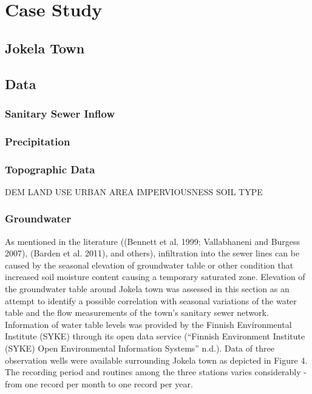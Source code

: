 
\chapter{Case Study}

\section{Jokela Town}

\section{Data}

    \subsection{Sanitary Sewer Inflow}
    
    \subsection{Precipitation}
    
    \subsection{Topographic Data}
    DEM
    LAND USE
    URBAN AREA
    IMPERVIOUSNESS
    SOIL TYPE
    
    \subsection{Groundwater}

As mentioned in the literature ((Bennett et al. 1999; Vallabhaneni and Burgess 2007), (Barden et al. 2011), and others), infiltration into the sewer lines can be caused by the seasonal elevation of groundwater table or other condition that increased soil moisture content causing a temporary saturated zone. Elevation of the groundwater table around Jokela town was assessed in this section as an attempt to identify a possible correlation with seasonal variations of the water table and the flow measurements of the town’s sanitary sewer network. 
Information of water table levels was provided by the Finnish Environmental Institute (SYKE) through its open data service (“Finnish Environment Institute (SYKE) Open Environmental Information Systems” n.d.). Data of three observation wells were available surrounding Jokela town as depicted in Figure 4. The recording period and routines among the three stations varies considerably - from one record per month to one record per year.

